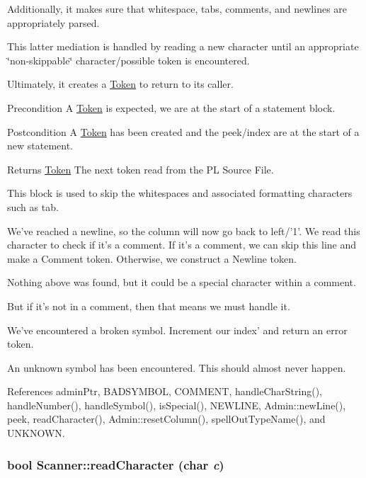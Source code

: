 Additionally, it makes sure that whitespace, tabs, comments, and newlines are appropriately parsed.

This latter mediation is handled by reading a new character until an appropriate \char`\"{}non-\/skippable\char`\"{} character/possible token is encountered.

Ultimately, it creates a \hyperlink{classToken}{Token} to return to its caller.

\begin{DoxyPrecond}{Precondition}
A \hyperlink{classToken}{Token} is expected, we are at the start of a statement block. 
\end{DoxyPrecond}
\begin{DoxyPostcond}{Postcondition}
A \hyperlink{classToken}{Token} has been created and the peek/index are at the start of a new statement. 
\end{DoxyPostcond}
\begin{DoxyReturn}{Returns}
\hyperlink{classToken}{Token} The next token read from the PL Source File. 
\end{DoxyReturn}


This block is used to skip the whitespaces and associated formatting characters such as tab.

We've reached a newline, so the column will now go back to left/'1'. We read this character to check if it's a comment. If it's a comment, we can skip this line and make a Comment token. Otherwise, we construct a Newline token.

Nothing above was found, but it could be a special character within a comment.

But if it's not in a comment, then that means we must handle it.

We've encountered a broken symbol. Increment our index' and return an error token.

An unknown symbol has been encountered. This should almost never happen. 



References adminPtr, BADSYMBOL, COMMENT, handleCharString(), handleNumber(), handleSymbol(), isSpecial(), NEWLINE, Admin::newLine(), peek, readCharacter(), Admin::resetColumn(), spellOutTypeName(), and UNKNOWN.

\hypertarget{classScanner_a7a3f12786edc746328451403aaa94288}{
\subsubsection[{readCharacter}]{\setlength{\rightskip}{0pt plus 5cm}bool Scanner::readCharacter (char {\em c})}}
\label{classScanner_a7a3f12786edc746328451403aaa94288}



